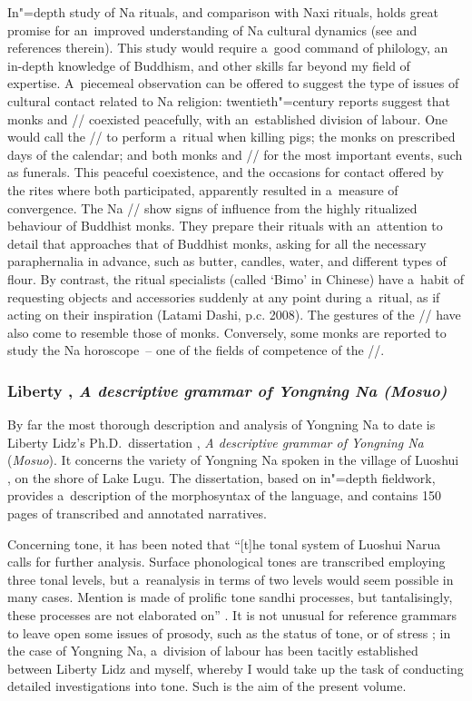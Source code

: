In"=depth study of Na rituals, and comparison with Naxi rituals, holds great promise for
an~improved understanding of Na cultural dynamics (see \citealt{mathieu2015} and references therein). This study would require a~good command of
 philology, an in-depth knowledge of  Buddhism, and other skills far beyond my field of expertise. A~piecemeal observation can
be offered to suggest the type of issues of cultural contact related to Na religion:
twentieth"=century reports suggest that monks and // coexisted peacefully, with
an~established division of labour. One would call the // to perform a~ritual when
killing pigs; the monks on prescribed days of the calendar; and both monks and // for
the most important events, such as funerals. This peaceful coexistence, and the occasions for
contact offered by the rites where both participated, apparently resulted in a~measure of
convergence. The Na // show signs of influence from the highly ritualized behaviour of
Buddhist monks. They prepare their rituals with an~attention to detail that approaches that of
Buddhist monks, asking for all the necessary paraphernalia in advance, such as butter, candles,
water, and different types of flour. By contrast, the  ritual specialists (called ‘Bimo’ 
in Chinese) have a~habit of requesting objects and accessories suddenly at any point during a~ritual,
as if acting on their inspiration (Latami Dashi, p.c. 2008). The gestures of the //
have also come to resemble those of monks. Conversely, some monks are reported to study the Na
horoscope~-- one of the fields of competence of the //.

\subsubsection{Liberty \citet{lidz2010}, \textit{A descriptive grammar of Yongning Na (Mosuo)}}
\label{sec:lidz2010}

By far the most thorough description and analysis of Yongning Na to date is Liberty Lidz’s
Ph.D.\ dissertation \citep{lidz2010}, \textit{A descriptive grammar of Yongning Na}
(\textit{Mosuo}). It concerns the variety of Yongning Na spoken in the village of Luoshui ,
on the shore of Lake Lugu. The dissertation, based on in"=depth fieldwork, provides a~description of the morphosyntax
of the language, and contains 150 pages of
transcribed and annotated narratives.

Concerning tone, it has been noted that “[t]he tonal system of Luoshui Narua calls for further
analysis. Surface phonological tones are transcribed employing three tonal levels, but a~reanalysis
in terms of two levels would seem possible in many cases. Mention is made of prolific {tone sandhi}
processes, but tantalisingly, these processes are not elaborated on” \citep{dobbsetal2016}. It is not unusual for reference grammars to leave open some issues of {prosody}, such as the status of tone, or of stress \citep[26]{zeitoun2007}; in the case of Yongning Na, a~division of labour has been tacitly established between Liberty Lidz and myself, whereby I would take up the task of conducting detailed investigations into tone. Such is the aim of the present volume.


